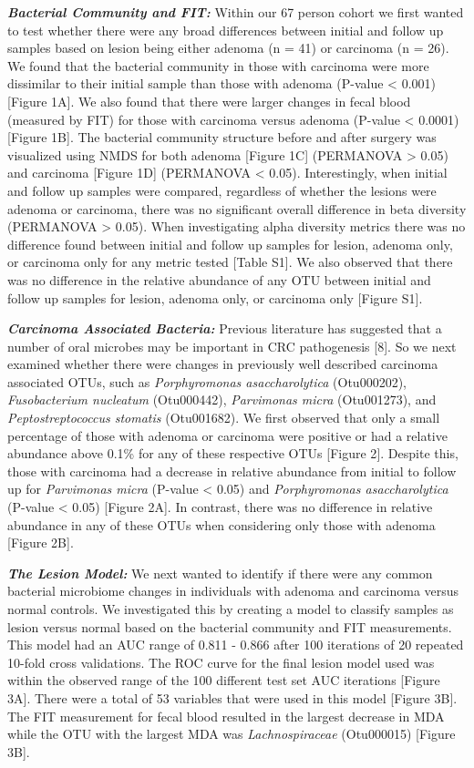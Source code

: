 \documentclass[12pt,]{article}
\begin{document}
\textbf{\emph{Bacterial Community and FIT:}} Within our 67 person cohort
we first wanted to test whether there were any broad differences between
initial and follow up samples based on lesion being either adenoma (n =
41) or carcinoma (n = 26). We found that the bacterial community in
those with carcinoma were more dissimilar to their initial sample than
those with adenoma (P-value \textless{} 0.001) {[}Figure 1A{]}. We also
found that there were larger changes in fecal blood (measured by FIT)
for those with carcinoma versus adenoma (P-value \textless{} 0.0001)
{[}Figure 1B{]}. The bacterial community structure before and after
surgery was visualized using NMDS for both adenoma {[}Figure 1C{]}
(PERMANOVA \textgreater{} 0.05) and carcinoma {[}Figure 1D{]} (PERMANOVA
\textless{} 0.05). Interestingly, when initial and follow up samples
were compared, regardless of whether the lesions were adenoma or
carcinoma, there was no significant overall difference in beta diversity
(PERMANOVA \textgreater{} 0.05). When investigating alpha diversity
metrics there was no difference found between initial and follow up
samples for lesion, adenoma only, or carcinoma only for any metric
tested {[}Table S1{]}. We also observed that there was no difference in
the relative abundance of any OTU between initial and follow up samples
for lesion, adenoma only, or carcinoma only {[}Figure S1{]}.

\textbf{\emph{Carcinoma Associated Bacteria:}} Previous literature has
suggested that a number of oral microbes may be important in CRC
pathogenesis {[}8{]}. So we next examined whether there were changes in
previously well described carcinoma associated OTUs, such as
\emph{Porphyromonas asaccharolytica} (Otu000202), \emph{Fusobacterium
nucleatum} (Otu000442), \emph{Parvimonas micra} (Otu001273), and
\emph{Peptostreptococcus stomatis} (Otu001682). We first observed that
only a small percentage of those with adenoma or carcinoma were positive
or had a relative abundance above 0.1\% for any of these respective OTUs
{[}Figure 2{]}. Despite this, those with carcinoma had a decrease in
relative abundance from initial to follow up for \emph{Parvimonas micra}
(P-value \textless{} 0.05) and \emph{Porphyromonas asaccharolytica}
(P-value \textless{} 0.05) {[}Figure 2A{]}. In contrast, there was no
difference in relative abundance in any of these OTUs when considering
only those with adenoma {[}Figure 2B{]}.

\textbf{\emph{The Lesion Model:}} We next wanted to identify if there
were any common bacterial microbiome changes in individuals with adenoma
and carcinoma versus normal controls. We investigated this by creating a
model to classify samples as lesion versus normal based on the bacterial
community and FIT measurements. This model had an AUC range of 0.811 -
0.866 after 100 iterations of 20 repeated 10-fold cross validations. The
ROC curve for the final lesion model used was within the observed range
of the 100 different test set AUC iterations {[}Figure 3A{]}. There were
a total of 53 variables that were used in this model {[}Figure 3B{]}.
The FIT measurement for fecal blood resulted in the largest decrease in
MDA while the OTU with the largest MDA was \emph{Lachnospiraceae}
(Otu000015) {[}Figure 3B{]}.
\end{document}
